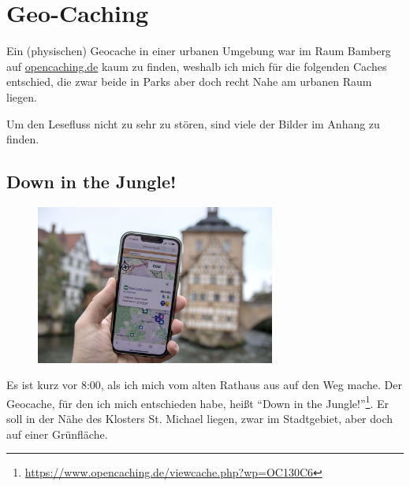 \section{Geo-Caching}

Ein (physischen) Geocache in einer urbanen Umgebung war im Raum Bamberg auf \url{opencaching.de} kaum zu finden, weshalb ich mich für die folgenden Caches entschied, die zwar beide in Parks aber doch recht Nahe am urbanen Raum liegen.

Um den Lesefluss nicht zu sehr zu stören, sind viele der Bilder im Anhang zu finden.

\subsection*{Down in the Jungle!}

\begin{figure}[H]
    \centering
    \includegraphics[width=0.7\textwidth]{figures/geocaching/first/IMG_3081.jpg}
\end{figure}

Es ist kurz vor 8:00, als ich mich vom alten Rathaus aus auf den Weg mache. Der Geocache, für den ich mich entschieden habe, heißt \enquote{Down in the Jungle!}\footnote{\url{https://www.opencaching.de/viewcache.php?wp=OC130C6}}. Er soll in der Nähe des Klosters St. Michael liegen, zwar im Stadtgebiet, aber doch auf einer Grünfläche.

